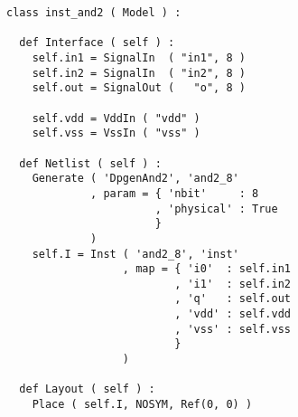 \begin{itemize}
\begin{verbatim}
class inst_and2 ( Model ) :

  def Interface ( self ) :
    self.in1 = SignalIn  ( "in1", 8 )
    self.in2 = SignalIn  ( "in2", 8 )
    self.out = SignalOut (   "o", 8 )

    self.vdd = VddIn ( "vdd" )
    self.vss = VssIn ( "vss" )
    
  def Netlist ( self ) :
    Generate ( 'DpgenAnd2', 'and2_8'
             , param = { 'nbit'     : 8
                       , 'physical' : True
                       }
             )      
    self.I = Inst ( 'and2_8', 'inst'
                  , map = { 'i0'  : self.in1
                          , 'i1'  : self.in2
                          , 'q'   : self.out
                          , 'vdd' : self.vdd
                          , 'vss' : self.vss
                          }
                  )
    
  def Layout ( self ) :
    Place ( self.I, NOSYM, Ref(0, 0) )
\end{verbatim}
\end{itemize}
